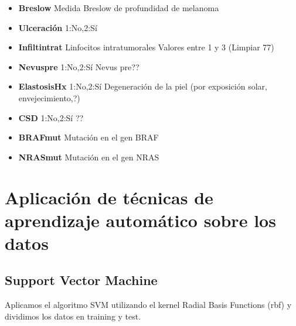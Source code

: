 \documentclass[11pt,spanish,listoffigures,listoftables]{tfgetsinf}
\begin{document}
\begin{itemize}
\item \textbf{Breslow}	Medida Breslow de profundidad de melanoma	
\item \textbf{Ulceraci\'on}	1:No,2:S\'i	
\item \textbf{Infiltintrat} Linfocitos intratumorales 	Valores entre 1 y 3 (Limpiar 77)	
\item \textbf{Nevuspre}	1:No,2:S\'i Nevus pre??	
\item \textbf{ElastosisHx}	1:No,2:S\'i Degeneraci\'on de la piel (por exposici\'on solar, envejecimiento,?)
\item \textbf{CSD}	1:No,2:S\'i ??	
\item \textbf{BRAFmut} Mutaci\'on en el gen BRAF
\item \textbf{NRASmut} Mutaci\'on en el gen NRAS
\end{itemize}


\chapter{Aplicaci\'on de t\'ecnicas de aprendizaje autom\'atico sobre los datos}

\section{Support Vector Machine}
Aplicamos el algoritmo SVM utilizando el kernel Radial Basis Functions (rbf) y dividimos los datos en training y test.\newline
\end{document}
